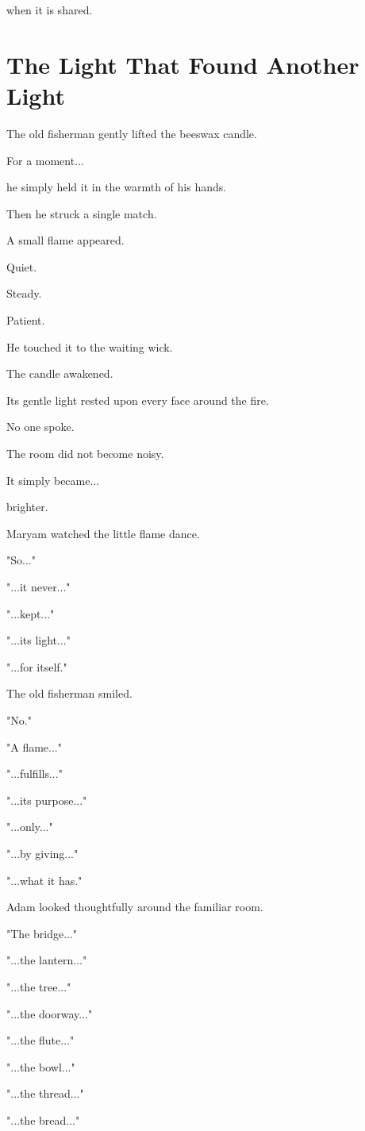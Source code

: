 \documentclass[12pt,openany]{book}
\begin{document}
when it is shared.
\section*{The Light That Found Another Light}

The old fisherman gently lifted the beeswax candle.

For a moment...

he simply held it in the warmth of his hands.

Then he struck a single match.

A small flame appeared.

Quiet.

Steady.

Patient.

He touched it to the waiting wick.

The candle awakened.

Its gentle light rested upon every face around the fire.

No one spoke.

The room did not become noisy.

It simply became...

brighter.

Maryam watched the little flame dance.

"So..."

"...it never..."

"...kept..."

"...its light..."

"...for itself."

The old fisherman smiled.

"No."

"A flame..."

"...fulfills..."

"...its purpose..."

"...only..."

"...by giving..."

"...what it has."

Adam looked thoughtfully around the familiar room.

"The bridge..."

"...the lantern..."

"...the tree..."

"...the doorway..."

"...the flute..."

"...the bowl..."

"...the thread..."

"...the bread..."
\end{document}
